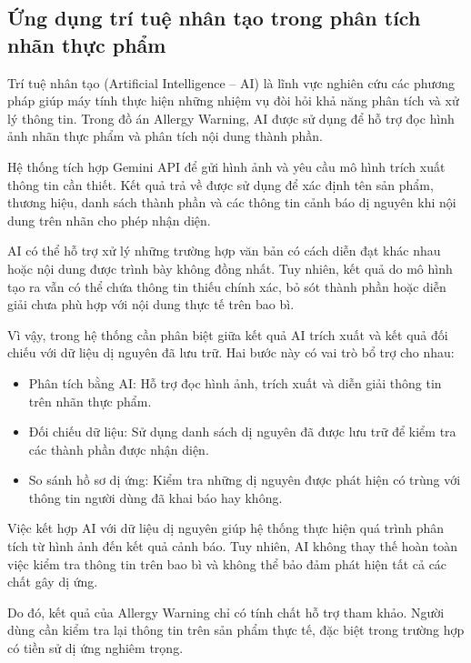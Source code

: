 	\subsection{Ứng dụng trí tuệ nhân tạo trong phân tích nhãn thực phẩm}
	
	Trí tuệ nhân tạo (Artificial Intelligence -- AI) là lĩnh vực
	nghiên cứu các phương pháp giúp máy tính thực hiện những nhiệm vụ
	đòi hỏi khả năng phân tích và xử lý thông tin. Trong đồ án
	Allergy Warning, AI được sử dụng để hỗ trợ đọc hình ảnh nhãn
	thực phẩm và phân tích nội dung thành phần.
	
	Hệ thống tích hợp Gemini API để gửi hình ảnh và yêu cầu mô hình
	trích xuất thông tin cần thiết. Kết quả trả về được sử dụng để
	xác định tên sản phẩm, thương hiệu, danh sách thành phần và các
	thông tin cảnh báo dị nguyên khi nội dung trên nhãn cho phép
	nhận diện.
	
	AI có thể hỗ trợ xử lý những trường hợp văn bản có cách diễn đạt
	khác nhau hoặc nội dung được trình bày không đồng nhất. Tuy nhiên,
	kết quả do mô hình tạo ra vẫn có thể chứa thông tin thiếu chính
	xác, bỏ sót thành phần hoặc diễn giải chưa phù hợp với nội dung
	thực tế trên bao bì.
	
	Vì vậy, trong hệ thống cần phân biệt giữa kết quả AI trích xuất
	và kết quả đối chiếu với dữ liệu dị nguyên đã lưu trữ. Hai bước
	này có vai trò bổ trợ cho nhau:
	
	\begin{itemize}
		\item Phân tích bằng AI: Hỗ trợ đọc hình ảnh, trích xuất và diễn giải thông tin trên nhãn thực phẩm.
		\item Đối chiếu dữ liệu: Sử dụng danh sách dị nguyên đã được lưu trữ để kiểm tra các thành phần được nhận diện.
		\item So sánh hồ sơ dị ứng: Kiểm tra những dị nguyên được phát hiện có trùng với thông tin người dùng đã khai báo hay không.
	\end{itemize}
	
	Việc kết hợp AI với dữ liệu dị nguyên giúp hệ thống thực hiện
	quá trình phân tích từ hình ảnh đến kết quả cảnh báo. Tuy nhiên,
	AI không thay thế hoàn toàn việc kiểm tra thông tin trên bao bì
	và không thể bảo đảm phát hiện tất cả các chất gây dị ứng.
	
	Do đó, kết quả của Allergy Warning chỉ có tính chất hỗ trợ
	tham khảo. Người dùng cần kiểm tra lại thông tin trên sản phẩm
	thực tế, đặc biệt trong trường hợp có tiền sử dị ứng nghiêm trọng.
	
